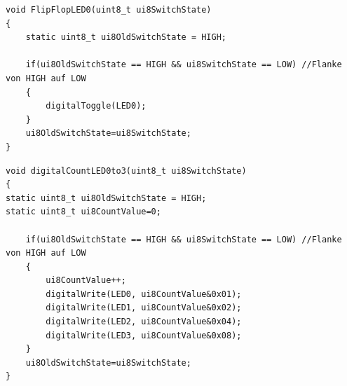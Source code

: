 \begin{lstlisting}[frame=htrbl, caption={LED auf Tastendruck Toggeln}, label={lst:FlipFlopLED0}]
void FlipFlopLED0(uint8_t ui8SwitchState)
{
	static uint8_t ui8OldSwitchState = HIGH;
	
	if(ui8OldSwitchState == HIGH && ui8SwitchState == LOW) //Flanke von HIGH auf LOW
	{
		digitalToggle(LED0);
	}
	ui8OldSwitchState=ui8SwitchState;
}
\end{lstlisting}
\newpage
\begin{lstlisting}[frame=htrbl, caption={Funktion digitalCountLED0to3()}, label={lst:digitalCountLED0to3}]
void digitalCountLED0to3(uint8_t ui8SwitchState)
{
static uint8_t ui8OldSwitchState = HIGH;
static uint8_t ui8CountValue=0;

	if(ui8OldSwitchState == HIGH && ui8SwitchState == LOW) //Flanke von HIGH auf LOW
	{
		ui8CountValue++;
		digitalWrite(LED0, ui8CountValue&0x01);
		digitalWrite(LED1, ui8CountValue&0x02); 
		digitalWrite(LED2, ui8CountValue&0x04);
		digitalWrite(LED3, ui8CountValue&0x08);
	}
	ui8OldSwitchState=ui8SwitchState;
}
\end{lstlisting}
\newpage
